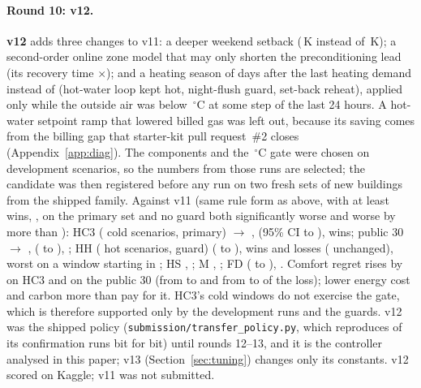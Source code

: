 \documentclass{article}
\begin{document}
\paragraph{Round 10: v12.}
\textbf{v12} adds three changes to v11: a deeper weekend setback (\RTenWkExtLo\,K instead of \RTenWkExtLoVEleven\,K);
a second-order online zone model that may only shorten the preconditioning lead (its recovery time
$\times$\RTenMprSafety); and a heating season of \RTenSeasonDays{} days after the last heating demand instead of
\RTenHeatSeasonDays{} (hot-water loop kept hot, night-flush guard, set-back reheat), applied only while the outside air
was below \RTenSeasonOatC\,$^\circ$C at some step of the last 24 hours. A hot-water setpoint ramp that lowered billed
gas was left out, because its saving comes from the billing gap that starter-kit pull request~\#2 closes
(Appendix~\ref{app:diag}). The components and the \RTenSeasonOatC\,$^\circ$C gate were chosen on development
scenarios, so the numbers from those runs are selected; the candidate was then registered before any run on two fresh
sets of \RTenNNewBuild{} new buildings from the shipped family. Against v11 (same rule form as above, with at least
\RTenRuleWins{} wins, \RTenRuleWinsPct, on the primary set and no guard both significantly worse and worse by more than
\RTenRuleMaterial): HC3 (\RTenConfHarshCThreeN{} cold scenarios, primary) \RTenConfHarshCThreeRef{} $\to$
\RTenConfHarshCThreeCand, \RTenConfHarshCThreeRel{} (95\% CI \RTenConfHarshCThreeRelLo{} to
\RTenConfHarshCThreeRelHi), \RTenConfHarshCThreeWins{} wins; public 30 \RTenConfPubRef{} $\to$ \RTenConfPubCand,
\RTenConfPubRel{} (\RTenConfPubRelLo{} to \RTenConfPubRelHi), \RTenConfPubWins; HH (\RTenConfHotHN{} hot scenarios,
guard) \RTenConfHotHRel{} (\RTenConfHotHRelLo{} to \RTenConfHotHRelHi), \RTenConfHotHWins{} wins and
\RTenConfHotHLosses{} losses (\RTenConfHotHTies{} unchanged), worst \RTenConfHotHWorstRel{} on a
\RTenConfHotHWorstStation{} window starting in \RTenConfHotHWorstMonth; HS \RTenConfHarshSRel, \RTenConfHarshSWins; M
\RTenConfMinnRel, \RTenConfMinnWins; FD \RTenConfFreshDefRel{} (\RTenConfFreshDefRelLo{} to \RTenConfFreshDefRelHi),
\RTenConfFreshDefWins. Comfort regret rises by \RTenComfRiseHCThree{} on HC3 and \RTenComfRisePub{} on the public 30
(from \RTenComfShareHCThreeRef{} to \RTenComfShareHCThreeCand{} and from \RTenComfSharePubRef{} to
\RTenComfSharePubCand{} of the loss); lower energy cost and carbon more than pay for it. HC3's cold windows do not
exercise the gate, which is therefore supported only by the development runs and the guards. v12 was the shipped policy
(\texttt{submission/transfer\_policy.py}, which reproduces \RTenXcheckN{} of its confirmation runs bit for bit) until
rounds 12--13, and it is the controller analysed in this paper; v13 (Section~\ref{sec:tuning}) changes only its
constants. v12 scored \RTenKagVTwelve{} on Kaggle; v11 was not submitted.
\end{document}
